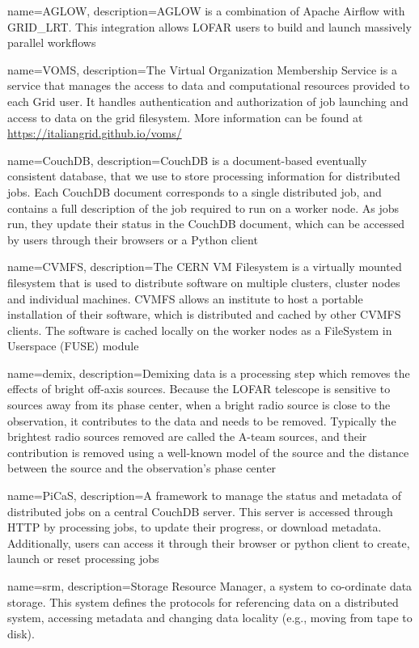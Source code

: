 {
    name={AGLOW},
    description={AGLOW is a combination of Apache Airflow with GRID\_LRT. This integration allows LOFAR users to build and launch massively parallel workflows
}}


{
    name=VOMS,
    description={The Virtual Organization Membership Service is a service that manages the access to data and computational resources provided to each Grid user. It handles authentication and authorization of job launching and access to data on the grid filesystem. More information can be found at \url{https://italiangrid.github.io/voms/} }
}

{
    name=CouchDB, 
    description={CouchDB is a document-based eventually consistent database, that we use to store processing information for distributed jobs. Each CouchDB document corresponds to a single distributed job, and contains a full description of the job required to run on a worker node. As jobs run, they update their status in the CouchDB document, which can be accessed by users through their browsers or a Python client}
}

{
    name=CVMFS,
    description={The CERN VM Filesystem is a virtually mounted filesystem that is used to distribute software on multiple clusters, cluster nodes and individual machines. CVMFS allows an institute to host a portable installation of their software, which is distributed and cached by other CVMFS clients. The software is cached locally on the worker nodes as a FileSystem in Userspace (FUSE) module }
}

{
    name=demix,
    description={Demixing data is a processing step which removes the effects of bright off-axis sources. Because the LOFAR telescope is sensitive to sources away from its phase center, when a bright radio source is close to the observation, it contributes to the data and needs to be removed. Typically the brightest radio sources removed are called the A-team sources, and their contribution is removed using a well-known model of the source and the distance between the source and the observation's phase center 
}}

{
    name=PiCaS,
    description={A framework to manage the status and metadata of distributed jobs on a central \Gls{CouchDB} server. This server is accessed through HTTP by processing jobs, to update their progress, or download metadata. Additionally, users can access it through their browser or python client to create, launch or reset processing jobs }
}

{
    name=srm, 
    description={Storage Resource Manager, a system to co-ordinate data storage. This system defines the protocols for referencing data on a distributed system, accessing metadata and changing data locality (e.g., moving from tape to disk). }
}
